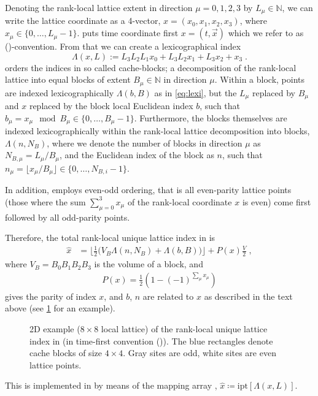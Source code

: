 Denoting the rank-local lattice extent in direction $\mu=0,1,2,3$ by $L_\mu \in \mathbb{N}$, we can write the lattice coordinate as a 4-vector, $x = (x_0,x_1,x_2,x_3)$, where $x_\mu \in \{ 0, \dots, L_\mu -1 \}$. \Openqxd puts time coordinate first $x = (t, \vec{x})$ which we refer to as (\txyz)-convention. From that we can create a lexicographical index
\begin{equation} \label{eq:lexi}
\Lambda(x, L) := L_3 L_2 L_1 x_0 + L_3 L_2 x_1 + L_3 x_2 + x_3 \;.
\end{equation}
\Openqxd orders the indices in so called cache-blocks; a decomposition of the rank-local lattice into equal blocks of extent $B_\mu \in \mathbb{N}$ in direction $\mu$. Within a block, points are indexed lexicographically $\Lambda(b, B)$ as in \cref{eq:lexi}, but the $L_\mu$ replaced by $B_\mu$ and $x$ replaced by the block local Euclidean index $b$, such that $b_\mu = x_\mu \mod B_\mu \in \{ 0, \dots, B_\mu -1 \}$.
Furthermore, the blocks themselves are indexed lexicographically within the rank-local lattice decomposition into blocks, \ie $\Lambda(n, N_B)$, where we denote the number of blocks in direction $\mu$ as $N_{B,\mu} = L_\mu / B_\mu$, and the Euclidean index of the block as $n$, such that $n_\mu = \lfloor x_\mu / B_\mu \rfloor \in \{ 0, \dots, N_{B,i} -1 \}$.

In addition, \openqxd employs even-odd ordering, that is all even-parity lattice points (those where the sum $\sum_{\mu=0}^3 x_\mu$ of the rank-local coordinate $x$ is even) come first followed by all odd-parity points.

Therefore, the total rank-local unique lattice index in \openqxd is
\begin{align} \label{eq:openqcd:ipt}
\hat{x} &= \biggl \lfloor \frac{1}{2} \Big( V_B \Lambda(n, N_B) + \Lambda(b, B) \Big) \biggr \rfloor + P(x) \frac{V}{2} \;,
\end{align}
where $V_B = B_0 B_1 B_2 B_3$ is the volume of a block, and
\begin{align} \label{eq:parity}
P(x)=\tfrac{1}{2}(1-(-1)^{\sum_\mu x_\mu})
\end{align}
gives the parity of index $x$, and $b$, $n$ are related to $x$ as described in the text above (see \cref{fig:index} for an example).
\begin{figure}
  \caption{2D example ($8 \times 8$ local lattice) of the rank-local unique lattice index in \openqxd (in time-first convention (\txyz)). The blue rectangles denote cache blocks of size $4 \times 4$. Gray sites are odd, white sites are even lattice points.}
  \label{fig:index}
\end{figure}
This is implemented in \openqxd by means of the mapping array , $\hat{x} \coloneqq \text{ipt}\left[\Lambda(x,L)\right]$.


